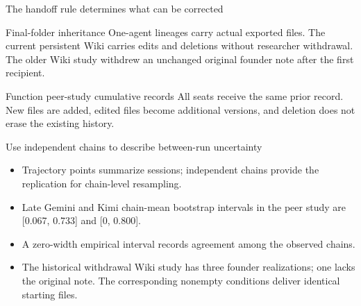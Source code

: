 \begin{frame}{The handoff rule determines what can be corrected}
  \begin{block}{Final-folder inheritance}
    One-agent lineages carry actual exported files. The current persistent Wiki
    carries edits and deletions without researcher withdrawal. The older Wiki
    study withdrew an unchanged original founder note after the first recipient.
  \end{block}
  \begin{block}{Function peer-study cumulative records}
    All seats receive the same prior record. New files are added, edited files
    become additional versions, and deletion does not erase the existing history.
  \end{block}
\end{frame}

\begin{frame}{Use independent chains to describe between-run uncertainty}
  \small
  \begin{itemize}
    \item Trajectory points summarize sessions; independent chains provide the
      replication for chain-level resampling.
    \item Late Gemini and Kimi chain-mean bootstrap intervals in the peer study
      are [0.067, 0.733] and [0, 0.800].
    \item A zero-width empirical interval records agreement among the observed chains.
    \item The historical withdrawal Wiki study has three founder realizations; one lacks the original note.
      The corresponding nonempty conditions deliver identical starting files.
  \end{itemize}
\end{frame}

